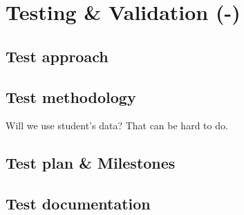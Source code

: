 
\section{Testing \& Validation (-)}
\label{sec:testing-validation}
\subsection{Test approach}
\lipsum[1]
\subsection{Test methodology}
Will we use student's data? That can be hard to do.

\subsection{Test plan \& Milestones}
\lipsum[1]
\subsection{Test documentation}
\lipsum[1]

